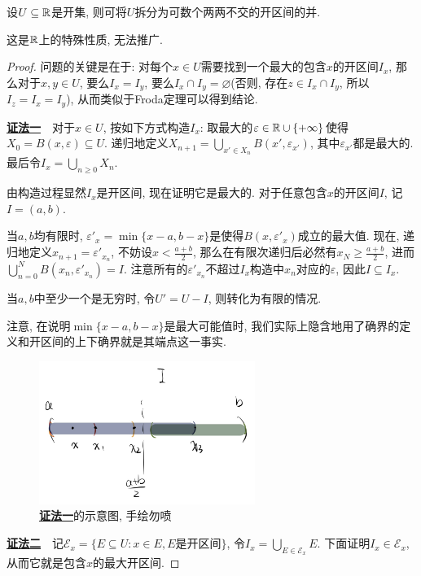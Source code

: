 \begin{proposition}{}
	设$U \subseteq \mathbb{R}$是开集, 则可将$U$拆分为可数个两两不交的开区间的并. 
\end{proposition}
\begin{remark}
	这是$\mathbb{R}$上的特殊性质, 无法推广. 
\end{remark}
\begin{proof}
	问题的关键是在于: 对每个$x \in U$需要找到一个最大的包含$x$的开区间$I_x$, 那么对于$x, y\in U$, 要么$I_x = I_y$, 要么$I_x \cap I_y = \varnothing$(否则, 存在$z \in I_x \cap I_y$, 所以$I_z = I_x = I_y$), 从而类似于Froda定理可以得到结论. 
	
	\underline{\textbf{证法一}}~~对于$x \in U$, 按如下方式构造$I_x$: 取最大的$\varepsilon \in \mathbb{R} \cup \{ +\infty \}$使得$X_0 = B(x,\varepsilon) \subseteq U$. 递归地定义$X_{n+1} = \bigcup_{x' \in X_n} B(x',\varepsilon _{x'})$, 其中$\varepsilon _{x'}$都是最大的. 最后令$I_x = \bigcup_{n \geq 0}X_n$. 
	
	由构造过程显然$I_x$是开区间, 现在证明它是最大的. 对于任意包含$x$的开区间$I$, 记$I=(a,b)$. 
	
	当$a,b$均有限时, $\varepsilon '_x = \min \{ x-a,b-x \}$是使得$B(x,\varepsilon '_x)$成立的最大值. 现在, 递归地定义$x_{n+1} = \varepsilon '_{x_n}$, 不妨设$x<\frac{a+b}{2}$, 那么在有限次递归后必然有$x_N \geq \frac{a+b}{2}$, 进而$\bigcup_{n=0}^{N} B(x_n, \varepsilon '_{x_n}) = I$. 注意所有的$\varepsilon '_{x_n}$不超过$I_x$构造中$x_n$对应的$\varepsilon$, 因此$I \subseteq I_x$. 
	
	当$a,b$中至少一个是无穷时, 令$U'=U-I$, 则转化为有限的情况. 
	
	注意, 在说明$\min \{ x-a,b-x \}$是最大可能值时, 我们实际上隐含地用了确界的定义和开区间的上下确界就是其端点这一事实. 
	
	\begin{figure}[H]
	\centering
	\includegraphics[width=7cm]{attachment/IMG_3538.jpg}
	\caption{\underline{\textbf{证法一}}的示意图, 手绘勿喷}
\end{figure}
	
	\underline{\textbf{证法二}}~~记$\mathcal{E}_x = \{ E \subseteq U: x \in E,E\textit{是开区间} \}$, 令$I_x = \bigcup_{E \in \mathcal{E}_x} E$. 下面证明$I_x \in \mathcal{E}_x$, 从而它就是包含$x$的最大开区间. 
	

\end{proof}
